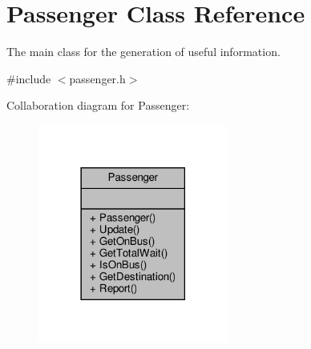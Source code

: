 \hypertarget{classPassenger}{}\section{Passenger Class Reference}
\label{classPassenger}


The main class for the generation of useful information.  




{\ttfamily \#include $<$passenger.\+h$>$}



Collaboration diagram for Passenger\+:\nopagebreak
\begin{figure}[H]
\begin{center}
\leavevmode
\includegraphics[width=177pt]{classPassenger__coll__graph}
\end{center}
\end{figure}
